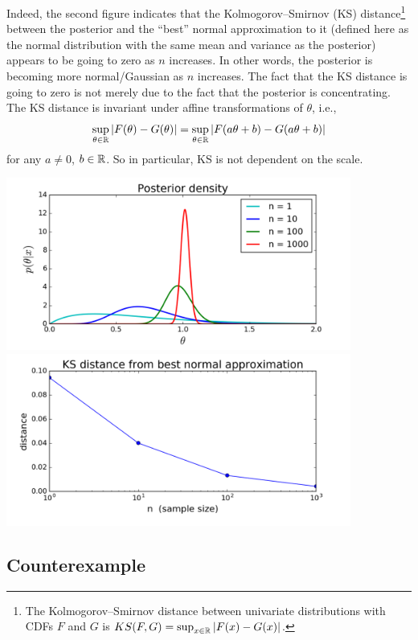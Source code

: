 \documentclass[12pt]{article}
\begin{document}
Indeed, the second figure indicates that the Kolmogorov--Smirnov (KS) distance\footnote{The Kolmogorov--Smirnov distance between univariate distributions with CDFs $F$ and $G$ is $KS(F,G) = \sup_{x\in\mathbb{R}} |F(x)-G(x)|$.} between the posterior and the ``best'' normal approximation to it (defined here as the normal distribution with the same mean and variance as the posterior) appears to be going to zero as $n$ increases. In other words, the posterior is becoming more normal/Gaussian as $n$ increases.
The fact that the KS distance is going to zero is not merely due to the fact that the posterior is concentrating. The KS distance is invariant under affine transformations of $\theta$, i.e., $$ \sup_{\theta\in\mathbb{R}} |F(\theta)-G(\theta)| = \sup_{\theta\in\mathbb{R}} |F(a \theta + b)-G(a \theta + b)|$$ for any $a\neq 0$, $b\in \mathbb{R}$. So in particular, KS is not dependent on the scale.

\begin{center}
\includegraphics[trim=0 0 0 0, clip, width=0.85\textwidth]{code/ex1-pdf.png}
\includegraphics[trim=0 0 0 0, clip, width=0.85\textwidth]{code/ex1-dist.png}
\end{center}




\subsection{Counterexample}
\end{document}
